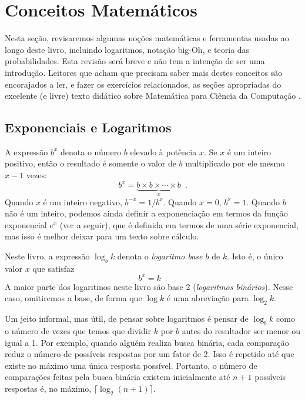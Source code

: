 
\section{Conceitos Matemáticos}
Nesta seção, revisaremos algumas noções matemáticas e ferramentas usadas 
ao longo deste livro, incluindo logaritmos, notação big-Oh, e
teoria das probabilidades. Esta revisão será breve e não tem a intenção
de ser uma introdução. Leitores que acham que precisam saber mais destes conceitos
são encorajados a ler, e fazer os exercícios relacionados, as seções apropriadas
do excelente (e livre) texto didático sobre Matemática para Ciência da Computação
\cite{llm11}.

\subsection{Exponenciais e Logaritmos}

%
%
A expressão $b^x$ denota o número $b$ elevado à potência $x$.
Se $x$ é um inteiro positivo, então o resultado é somente o valor de $b$ multiplicado por ele mesmo $x-1$ vezes:
\[
    b^x = \underbrace{b\times b\times \cdots \times b}_{x} \enspace .
\]
Quando $x$ é um inteiro negativo, $b^{-x}=1/b^{x}$. 
Quando $x=0$, $b^x=1$.
Quando $b$ não é um inteiro, podemos ainda definir a exponenciação em termos da função exponencial 
$e^x$ (ver a seguir), que é definida em termos de uma série exponencial, mas isso é melhor deixar para um texto sobre cálculo. 

%
Neste livro, a expressão 
$\log_b k$ denota o \emph{logaritmo base $b$}
de $k$.  Isto é, o único valor $x$ que satisfaz 
\[
    b^{x} = k  \enspace .
\]
A maior parte dos logaritmos neste livro são base 2 (\emph{logaritmos binários}).
%
%
Nesse caso, omitiremos a base, de forma que 
$\log k$ é uma abreviação para 
$\log_2 k$.

Um jeito informal, mas útil, de pensar sobre logaritmos é pensar
de $\log_b k$ como o número de vezes que temos que dividir $k$ por $b$
antes do resultador ser menor ou igual a 1. Por exemplo, quando alguém realiza
busca binária, cada comparação reduz o número de possíveis respostas por 
um fator de 2. Isso é repetido até que existe no máximo uma única resposta 
possível. Portanto, o número de comparações feitas pela busca binária 
existem inicialmente até $n+1$ possíveis respostas é, no máximo, 
$\lceil\log_2(n+1)\rceil$.

